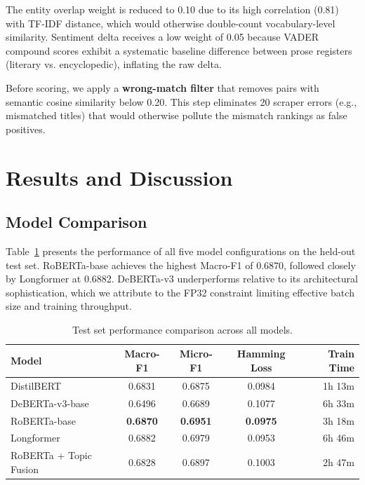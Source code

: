 \documentclass[11pt,a4paper]{article}
\begin{document}
The entity overlap weight is reduced to 0.10 due to its high correlation (0.81) with TF-IDF distance, which would otherwise double-count vocabulary-level similarity. Sentiment delta receives a low weight of 0.05 because VADER compound scores exhibit a systematic baseline difference between prose registers (literary vs. encyclopedic), inflating the raw delta.

Before scoring, we apply a \textbf{wrong-match filter} that removes pairs with semantic cosine similarity below 0.20. This step eliminates 20 scraper errors (e.g., mismatched titles) that would otherwise pollute the mismatch rankings as false positives.

\section{Results and Discussion}

\subsection{Model Comparison}

Table~\ref{tab:comparison} presents the performance of all five model configurations on the held-out test set. RoBERTa-base achieves the highest Macro-F1 of 0.6870, followed closely by Longformer at 0.6882. DeBERTa-v3 underperforms relative to its architectural sophistication, which we attribute to the FP32 constraint limiting effective batch size and training throughput.

\begin{table}[H]
\centering
\caption{Test set performance comparison across all models.}
\label{tab:comparison}
\begin{tabular}{lcccr}
\toprule
\textbf{Model} & \textbf{Macro-F1} & \textbf{Micro-F1} & \textbf{Hamming Loss} & \textbf{Train Time} \\
\midrule
DistilBERT              & 0.6831 & 0.6875 & 0.0984 & 1h 13m \\
DeBERTa-v3-base         & 0.6496 & 0.6689 & 0.1077 & 6h 33m \\
RoBERTa-base            & \textbf{0.6870} & \textbf{0.6951} & \textbf{0.0975} & 3h 18m \\
Longformer              & 0.6882 & 0.6979 & 0.0953 & 6h 46m \\
RoBERTa + Topic Fusion  & 0.6828 & 0.6897 & 0.1003 & 2h 47m \\
\bottomrule
\end{tabular}
\end{table}
\end{document}
